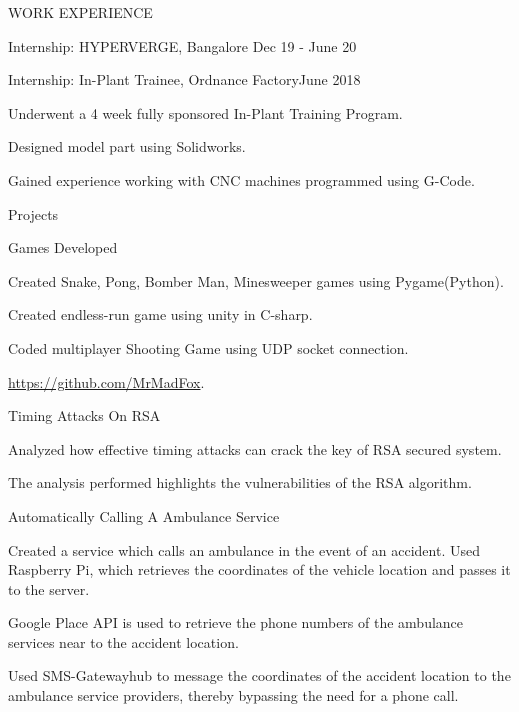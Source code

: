 \documentclass{resume} %
\begin{document}
\begin{rSection}{ WORK EXPERIENCE }
\begin{rSubsection}{ Internship: HYPERVERGE, Bangalore} {Dec 19 - June 20}{}
\end{rSubsection}

\begin{rSubsection}{ Internship: In-Plant Trainee, Ordnance Factory}{June 2018}{}

    \item Underwent a 4 week fully sponsored In-Plant Training Program.
    \item Designed model part using Solidworks.
    \item Gained experience working with CNC machines programmed using G-Code.

\end{rSubsection}

\end{rSection}

\begin{rSection}{Projects}

\begin{rSubsection}{ Games Developed}{}{}

\item Created Snake, Pong, Bomber Man, Minesweeper games using Pygame(Python).
\item Created endless-run game using unity in C-sharp.
\item Coded multiplayer Shooting Game using UDP socket connection.
\item  \url{https://github.com/MrMadFox}.

\end{rSubsection}

\begin{rSubsection}{ Timing Attacks On RSA}{}{}

\item Analyzed how effective timing attacks can crack the key of RSA secured system.
\item The analysis performed highlights the vulnerabilities of the RSA algorithm.

\end{rSubsection}


\begin{rSubsection}{ Automatically Calling A Ambulance Service}{}{}

\item Created a service which calls an ambulance in the event of an accident. Used Raspberry Pi, which retrieves the coordinates of the vehicle location and passes it to the server.
\item Google Place API is used to retrieve the phone numbers of the ambulance services near to the accident location.
\item Used SMS-Gatewayhub to message the coordinates of the accident location to the ambulance service providers, thereby bypassing the need for a phone call.


\end{rSubsection}
\end{rSection}
\end{document}
